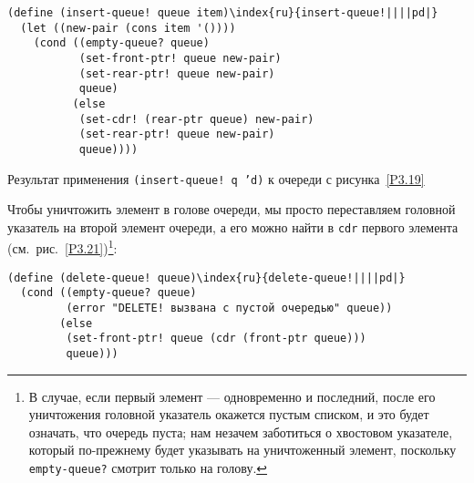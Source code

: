 \begin{Verbatim}[fontsize=\small]
(define (insert-queue! queue item)\index{ru}{insert-queue!||||pd|}
  (let ((new-pair (cons item '())))
    (cond ((empty-queue? queue)
           (set-front-ptr! queue new-pair)
           (set-rear-ptr! queue new-pair)
           queue)
          (else
           (set-cdr! (rear-ptr queue) new-pair)
           (set-rear-ptr! queue new-pair)
           queue))))
\end{Verbatim}


\begin{cntrfig}

\caption{Результат применения
{\tt (insert-queue! q 'd)} к очереди с
рисунка~\ref{P3.19}}
\label{P3.20}

\end{cntrfig}

Чтобы уничтожить элемент в голове очереди, мы просто
переставляем головной указатель на второй элемент очереди, а его можно
найти в {\tt cdr} первого элемента
(см.~рис.~\ref{P3.21})\footnote{В случае, если первый элемент --- одновременно и последний,
после его уничтожения головной указатель окажется пустым списком, и
это будет означать, что очередь пуста; нам незачем заботиться о хвостовом
указателе, который по-прежнему будет указывать на уничтоженный
элемент, поскольку {\tt empty-queue?} смотрит
только на голову.}:

\begin{Verbatim}[fontsize=\small]
(define (delete-queue! queue)\index{ru}{delete-queue!||||pd|}
  (cond ((empty-queue? queue)
         (error "DELETE! вызвана с пустой очередью" queue))
        (else
         (set-front-ptr! queue (cdr (front-ptr queue)))
         queue)))
\end{Verbatim}


